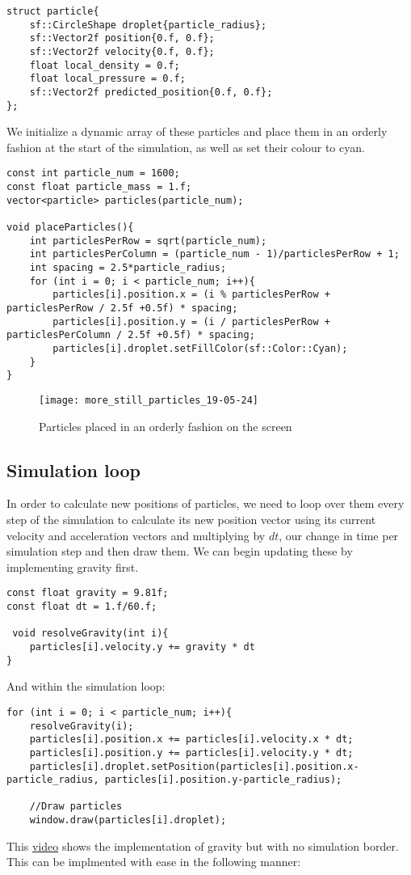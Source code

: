 \documentclass[write-up.tex]{subfiles}
\begin{document}
\begin{lstlisting}
struct particle{
    sf::CircleShape droplet{particle_radius};
    sf::Vector2f position{0.f, 0.f};
    sf::Vector2f velocity{0.f, 0.f};
    float local_density = 0.f;
    float local_pressure = 0.f;
    sf::Vector2f predicted_position{0.f, 0.f};
};
\end{lstlisting}

We initialize a dynamic array of these particles and place them in an orderly fashion at the start of the simulation, as well as set their colour to cyan.

\begin{lstlisting}
const int particle_num = 1600;
const float particle_mass = 1.f;
vector<particle> particles(particle_num);

void placeParticles(){
    int particlesPerRow = sqrt(particle_num);
    int particlesPerColumn = (particle_num - 1)/particlesPerRow + 1;
    int spacing = 2.5*particle_radius;
    for (int i = 0; i < particle_num; i++){
        particles[i].position.x = (i % particlesPerRow + particlesPerRow / 2.5f +0.5f) * spacing;
        particles[i].position.y = (i / particlesPerRow + particlesPerColumn / 2.5f +0.5f) * spacing;
        particles[i].droplet.setFillColor(sf::Color::Cyan);
    }
}

\end{lstlisting}

\begin{figure}
\centering
\texttt{[image: more\_still\_particles\_19-05-24]}
\caption{Particles placed in an orderly fashion on the screen}
\end{figure}

\newpage
\subsection{Simulation loop}
In order to calculate new positions of particles, we need to loop over them every step of the simulation to calculate its new position vector using its current velocity and acceleration vectors and multiplying by $dt$, our change in time per simulation step and then draw them. We can begin updating these by implementing gravity first.
\begin{lstlisting}
const float gravity = 9.81f;
const float dt = 1.f/60.f;

 void resolveGravity(int i){
    particles[i].velocity.y += gravity * dt
}
\end{lstlisting}

And within the simulation loop:
\begin{lstlisting}
for (int i = 0; i < particle_num; i++){
    resolveGravity(i);
    particles[i].position.x += particles[i].velocity.x * dt;
    particles[i].position.y += particles[i].velocity.y * dt;
    particles[i].droplet.setPosition(particles[i].position.x-particle_radius, particles[i].position.y-particle_radius);

    //Draw particles
    window.draw(particles[i].droplet);
\end{lstlisting}
This \href{https://youtube.com/shorts/FSuH_Cs1Qh4?feature=share}{video} shows the implementation of gravity but with no simulation border. This can be implmented with ease in the following manner:
\end{document}
